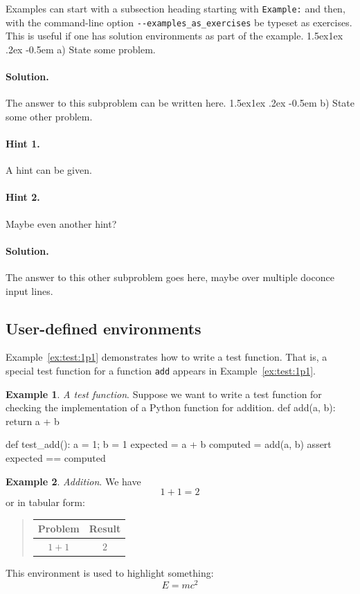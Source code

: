 \documentclass[%
oneside,                 %
final,                   %
10pt]{article}
\makeatletter
\newenvironment{doconceexercise}{}{}
\newcommand\subex{\@startsection{paragraph}{4}{\z@}%
                  {1.5ex\@plus1ex \@minus.2ex}%
                  {-0.5em}%
                  {\normalfont\normalsize\bfseries}}
\theoremstyle{definition}
\newtheorem{example}{Example}[section]
\makeatother
\begin{document}
\begin{enumerate}
\begin{doconceexercise}
\label{Example}
Examples can start with a subsection heading starting with \texttt{Example:}
and then, with the command-line option \Verb!--examples_as_exercises! be
typeset as exercises. This is useful if one has solution
environments as part of the example.
\subex{a)}
State some problem.
\paragraph{Solution.}
The answer to this subproblem can be written here.
\subex{b)}
State some other problem.
\paragraph{Hint 1.}
A hint can be given.
\paragraph{Hint 2.}
Maybe even another hint?
\paragraph{Solution.}
The answer to this other subproblem goes here,
maybe over multiple doconce input lines.
\end{doconceexercise}
\subsection{User-defined environments}
Example~\vref{ex:test:1p1} demonstrates how to write a test function.
That is, a special test function for a function \texttt{add} appears in
Example~\vref{ex:test:1p1}.
\begin{example}
\label{ex:test:1p1}
\noindent\emph{A test function}.
Suppose we want to write a test function for checking the
implementation of a Python function for addition.
\bpycod
def add(a, b):
    return a + b

def test_add():
    a = 1; b = 1
    expected = a + b
    computed = add(a, b)
    assert expected == computed

\epycod

\end{example}
\begin{example}
\label{ex:math:1p1}
\noindent\emph{Addition}.
We have
\[ 1 + 1 = 2 \]
or in tabular form:
\begin{quote}
\begin{tabular}{cc}
\hline
\multicolumn{1}{c}{ Problem } & \multicolumn{1}{c}{ Result } \\
\hline
$1+1$   & $2$    \\
\hline
\end{tabular}
\end{quote}
\noindent
\end{example}
\begin{tcolorbox}[%
boxrule=1mm,
coltitle=black,
colframe=blue!45!white,
colback=blue!15!white,
width=(.9\linewidth),before=\hfill,after=\hfill,
adjusted title={Highlight box!}]
This environment is used to highlight something:
\[ E = mc^2 \]
\end{tcolorbox}

\end{enumerate}
\end{document}
